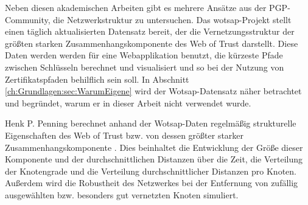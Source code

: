 Neben diesen akademischen Arbeiten gibt es mehrere Ansätze aus der
PGP-Community, die Netzwerkstruktur zu untersuchen. Das
wotsap-Projekt\cite{Cederlof} stellt einen täglich aktualisierten
Datensatz bereit, der die Vernetzungsstruktur der größten starken
Zusammenhangskomponente des Web of Trust darstellt. Diese Daten werden
werden für eine Webapplikation benutzt, die kürzeste Pfade
zwischen Schlüsseln berechnet und visualisiert und so bei der
Nutzung von Zertifikatspfaden behilflich sein soll. In Abschnitt
\ref{ch:Grundlagen:sec:WarumEigene} wird der Wotsap-Datensatz näher
betrachtet und begründet, warum er in dieser Arbeit nicht verwendet
wurde. 


Henk P. Penning berechnet anhand der Wotsap-Daten regelmäßig
strukturelle Eigenschaften des Web of Trust bzw. von dessen größter
starker Zusammenhangskomponente \cite{Penning}. Dies beinhaltet die
Entwicklung der Größe dieser Komponente und der durchschnittlichen
Distanzen über die Zeit, die Verteilung der Knotengrade und die
Verteilung durchschnittlicher Distanzen pro Knoten. Außerdem wird die
Robustheit des Netzwerkes bei der Entfernung von zufällig
ausgewählten bzw. besonders gut vernetzten Knoten simuliert.

